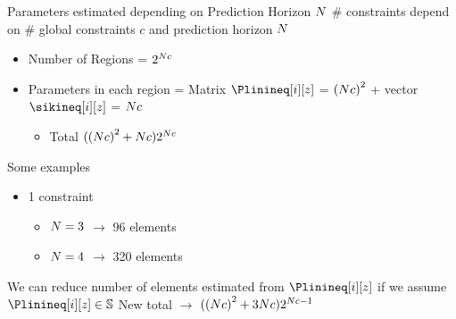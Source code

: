 \documentclass[aspectratio=169]{beamer}
\begin{document}
\begin{frame}{Parameters estimated depending on Prediction Horizon $N$}
  \# constraints depend on \# global constraints $c$ and prediction horizon $N$

  \begin{itemize}
    \item Number of Regions = $2^{N c}$
    \item Parameters in each region = Matrix $\Plinineq[i][z]$ = ${(N c)}^{2}$ + vector $\sikineq[i][z]$ = $N c$
          \begin{itemize}
                  \item Total $({(N c)}^{2}+N c)2^{N c}$
          \end{itemize}
  \end{itemize}

  Some examples
  \begin{itemize}
    \item 1 constraint
          \begin{itemize}
            \item $N = 3$ $\to$ 96 elements
            \item $N = 4$ $\to$ 320 elements
          \end{itemize}
  \end{itemize}

  \begin{remark}
    We can reduce number of elements estimated from $\Plinineq[i][z]$ if we assume $\Plinineq[i][z]\in\symmetric$
    New total $\to$ $({(N c)}^{2}+3N c)2^{N c-1}$
  \end{remark}
\end{frame}
\end{document}
